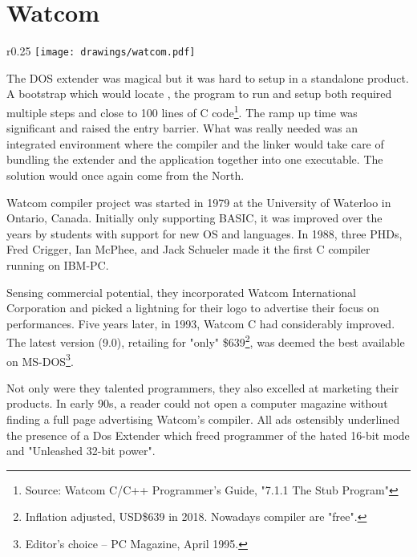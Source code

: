 \section{Watcom}

\begin{wrapfigure}[9]{r}{0.25\textwidth}
\centering
\texttt{[image: drawings/watcom.pdf]}
\end{wrapfigure}


The DOS extender was magical but it was hard to setup in a standalone product. A bootstrap which would locate , the program to run and setup both required multiple steps and close to 100 lines of C code\footnote{Source: Watcom C/C++ Programmer's Guide, "7.1.1 The Stub Program"}. The ramp up time was significant and raised the entry barrier. What was really needed was an integrated environment where the compiler and the linker would take care of bundling the extender and the application together into one executable. The solution would once again come from the North.\\ 
\par

Watcom compiler project was started in 1979 at the University of Waterloo in Ontario, Canada. Initially only supporting BASIC, it was improved over the years by students with support for new OS and languages. In 1988, three PHDs, Fred Crigger, Ian McPhee, and Jack Schueler made it the first C compiler running on IBM-PC.\\
\par
Sensing commercial potential, they incorporated Watcom International Corporation and picked a lightning for their logo to advertise their focus on performances. Five years later, in 1993, Watcom C had considerably improved. The latest version (9.0), retailing for "only" \$639\footnote{Inflation adjusted, USD\$639 in 2018. Nowadays compiler are "free".},  was deemed the best available on MS-DOS\footnote{Editor's choice -- PC Magazine, April 1995.}. \\
\par
Not only were they talented programmers, they also excelled at marketing their products. In early 90s, a reader could not open a computer magazine without finding a full page advertising Watcom's compiler. All ads ostensibly underlined the presence of a Dos Extender which freed programmer of the hated 16-bit mode and "Unleashed 32-bit power".
\par
\label{watcomad}



